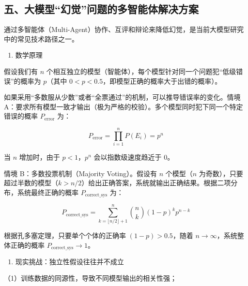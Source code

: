 \hypertarget{ux4e94ux5927ux6a21ux578bux5e7bux89c9ux95eeux9898ux7684ux591aux667aux80fdux4f53ux89e3ux51b3ux65b9ux6848}{%
\subsection{五、大模型``幻觉''问题的多智能体解决方案}\label{ux4e94ux5927ux6a21ux578bux5e7bux89c9ux95eeux9898ux7684ux591aux667aux80fdux4f53ux89e3ux51b3ux65b9ux6848}}

通过多智能体（Multi-Agent）协作、互评和辩论来降低幻觉，是当前大模型研究中的常见技术路径之一。

\begin{enumerate}
\def\labelenumi{\arabic{enumi}.}
\tightlist
\item
  数学原理
\end{enumerate}

假设我们有 \(n\) 个相互独立的模型（智能体），每个模型针对同一个问题犯``低级错误''的概率为 \(p\)（其中 \(0<p<0.5\)，即模型正确的概率大于出错的概率）。

如果采用``多数服从少数''或者``全票通过''的机制，可以推导错误率的变化。情境 A：要求所有模型一致才输出（极为严格的校验）。多个模型同时犯下同一个特定错误的概率 \(P_{\mathrm{error}}\) 为：

\[
P_{\mathrm{error}}=\prod_{i=1}^{n}P(E_i)=p^n
\]

当 \(n\) 增加时，由于 \(p<1\)，\(p^n\) 会以指数级速度趋近于 0。

情境 B：多数投票机制（Majority Voting）。假设有 \(n\) 个模型（\(n\) 为奇数），只要超过半数的模型（\(k>n/2\)）给出正确答案，系统就输出正确结果。根据二项分布，系统最终正确的概率 \(P_{\mathrm{correct\_sys}}\) 为：

\[
P_{\mathrm{correct\_sys}}=\sum_{k=\lfloor n/2\rfloor+1}^{n}\binom{n}{k}(1-p)^k p^{n-k}
\]

根据孔多塞定理，只要单个个体的正确率 \((1-p)>0.5\)，随着 \(n\to\infty\)，系统整体正确的概率 \(P_{\mathrm{correct\_sys}}\to 1\)。

\begin{enumerate}
\def\labelenumi{\arabic{enumi}.}
\setcounter{enumi}{1}
\tightlist
\item
  现实挑战：独立性假设往往并不成立
\end{enumerate}

（1）训练数据的同源性，导致不同模型输出的相关性强；

